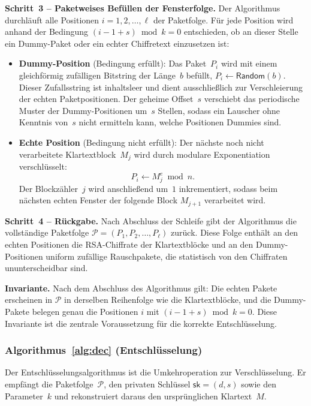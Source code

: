 ﻿\documentclass[12pt, a4paper]{article}
\theoremstyle{plain}
\theoremstyle{definition}
\theoremstyle{remark}
\newcommand{\sk}{\mathsf{sk}}
\begin{document}
\medskip
\noindent\textbf{Schritt~3 -- Paketweises Bef\"ullen der Fensterfolge.}
Der Algorithmus durchl\"auft alle Positionen $i = 1, 2, \ldots, \ell$ der
Paketfolge. F\"ur jede Position wird anhand der Bedingung
$(i - 1 + s) \bmod k = 0$ entschieden, ob an dieser Stelle ein Dummy-Paket
oder ein echter Chiffretext einzusetzen ist:

\begin{itemize}
  \item \textbf{Dummy-Position} (Bedingung erf\"ullt): Das Paket~$P_i$ wird
  mit einem gleichf\"ormig zuf\"alligen Bitstring der L\"ange~$b$ bef\"ullt,
  $P_i \gets \mathsf{Random}(b)$. Dieser Zufallsstring ist inhaltsleer und
  dient ausschlie\ss{}lich zur Verschleierung der echten Paketpositionen.
  Der geheime Offset~$s$ verschiebt das periodische Muster der Dummy-Positionen
  um~$s$ Stellen, sodass ein Lauscher ohne Kenntnis von~$s$ nicht ermitteln
  kann, welche Positionen Dummies sind.

  \item \textbf{Echte Position} (Bedingung nicht erf\"ullt): Der n\"achste
  noch nicht verarbeitete Klartextblock~$M_j$ wird durch modulare
  Exponentiation verschl\"usselt:
  \[
    P_i \gets M_j^e \bmod n.
  \]
  Der Blockz\"ahler~$j$ wird anschlie\ss{}end um~$1$ inkrementiert, sodass
  beim n\"achsten echten Fenster der folgende Block $M_{j+1}$ verarbeitet wird.
\end{itemize}

\medskip
\noindent\textbf{Schritt~4 -- R\"uckgabe.}
Nach Abschluss der Schleife gibt der Algorithmus die vollst\"andige
Paketfolge $\mathcal{P} = (P_1, P_2, \ldots, P_\ell)$ zur\"uck.
Diese Folge enth\"alt an den echten Positionen die RSA-Chiffrate der
Klartextbl\"ocke und an den Dummy-Positionen uniform zuf\"allige
Rauschpakete, die statistisch von den Chiffraten ununterscheidbar sind.

\medskip
\noindent\textbf{Invariante.}
Nach dem Abschluss des Algorithmus gilt: Die echten Pakete erscheinen
in $\mathcal{P}$ in derselben Reihenfolge wie die Klartextbl\"ocke,
und die Dummy-Pakete belegen genau die Positionen $i$ mit
$(i - 1 + s) \bmod k = 0$. Diese Invariante ist die zentrale Voraussetzung
f\"ur die korrekte Entschl\"usselung.

\subsubsection{Algorithmus~\ref{alg:dec} (Entschl\"usselung)}

Der Entschl\"usselungsalgorithmus ist die Umkehroperation zur Verschl\"usselung.
Er empf\"angt die Paketfolge~$\mathcal{P}$, den privaten Schl\"ussel
$\sk = (d, s)$ sowie den Parameter~$k$ und rekonstruiert daraus den
urspr\"unglichen Klartext~$M$.
\end{document}
